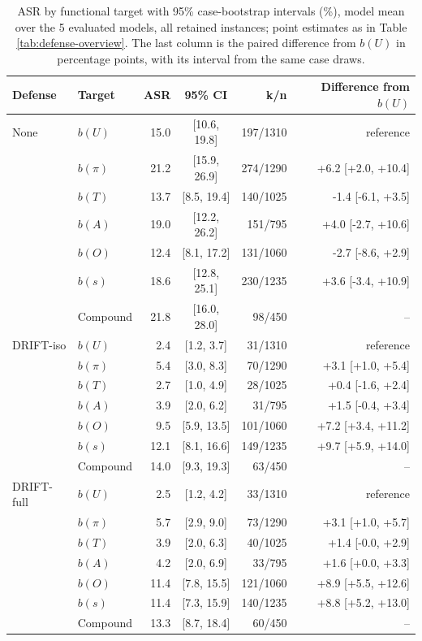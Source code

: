 \begin{table}[H]
\centering
\caption{ASR by functional target with 95\% case-bootstrap intervals (\%), model mean over the 5 evaluated models, all retained instances; point estimates as in Table \ref{tab:defense-overview}. The last column is the paired difference from \(b(U)\) in percentage points, with its interval from the same case draws.}
\label{tab:target-ci}
\begingroup
\tablefont
\begin{tabular}{@{}llrcrr@{}}
\toprule
\textbf{Defense} & \textbf{Target} & \textbf{ASR} & \textbf{95\% CI} & \textbf{k/n} & \textbf{Difference from \(b(U)\)} \\
\midrule
None & \(b(U)\) & 15.0 & [10.6, 19.8] & 197/1310 & reference \\
 & \(b(\pi)\) & 21.2 & [15.9, 26.9] & 274/1290 & +6.2 [+2.0, +10.4] \\
 & \(b(T)\) & 13.7 & [8.5, 19.4] & 140/1025 & -1.4 [-6.1, +3.5] \\
 & \(b(A)\) & 19.0 & [12.2, 26.2] & 151/795 & +4.0 [-2.7, +10.6] \\
 & \(b(O)\) & 12.4 & [8.1, 17.2] & 131/1060 & -2.7 [-8.6, +2.9] \\
 & \(b(s)\) & 18.6 & [12.8, 25.1] & 230/1235 & +3.6 [-3.4, +10.9] \\
 & Compound & 21.8 & [16.0, 28.0] & 98/450 & -- \\
\midrule
DRIFT-iso & \(b(U)\) & 2.4 & [1.2, 3.7] & 31/1310 & reference \\
 & \(b(\pi)\) & 5.4 & [3.0, 8.3] & 70/1290 & +3.1 [+1.0, +5.4] \\
 & \(b(T)\) & 2.7 & [1.0, 4.9] & 28/1025 & +0.4 [-1.6, +2.4] \\
 & \(b(A)\) & 3.9 & [2.0, 6.2] & 31/795 & +1.5 [-0.4, +3.4] \\
 & \(b(O)\) & 9.5 & [5.9, 13.5] & 101/1060 & +7.2 [+3.4, +11.2] \\
 & \(b(s)\) & 12.1 & [8.1, 16.6] & 149/1235 & +9.7 [+5.9, +14.0] \\
 & Compound & 14.0 & [9.3, 19.3] & 63/450 & -- \\
\midrule
DRIFT-full & \(b(U)\) & 2.5 & [1.2, 4.2] & 33/1310 & reference \\
 & \(b(\pi)\) & 5.7 & [2.9, 9.0] & 73/1290 & +3.1 [+1.0, +5.7] \\
 & \(b(T)\) & 3.9 & [2.0, 6.3] & 40/1025 & +1.4 [-0.0, +2.9] \\
 & \(b(A)\) & 4.2 & [2.0, 6.9] & 33/795 & +1.6 [+0.0, +3.3] \\
 & \(b(O)\) & 11.4 & [7.8, 15.5] & 121/1060 & +8.9 [+5.5, +12.6] \\
 & \(b(s)\) & 11.4 & [7.3, 15.9] & 140/1235 & +8.8 [+5.2, +13.0] \\
 & Compound & 13.3 & [8.7, 18.4] & 60/450 & -- \\
\bottomrule
\end{tabular}
\endgroup
\end{table}

